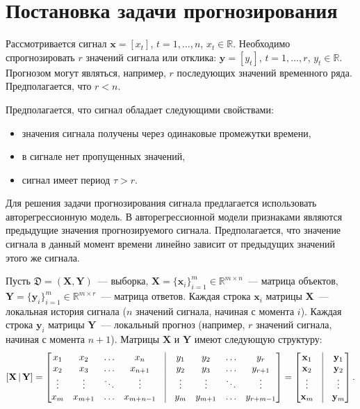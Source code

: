 \documentclass[12pt,twoside]{article}
\newcommand{\bx}{\mathbf{x}}
\newcommand{\by}{\mathbf{y}}
\newcommand{\bY}{\mathbf{Y}}
\newcommand{\bX}{\mathbf{X}}
\begin{document}

\section{Постановка задачи прогнозирования}
Рассмотривается сигнал $\mathbf{x} = [x_t]$,  $t = 1, \dots , n$, $x_t \in \mathbb{R}$. Необходимо спрогнозировать $r$ значений сигнала или отклика:  
$\mathbf{y} = [y_t]$,  $t = 1, \dots , r$, $y_t \in \mathbb{R}$. 
Прогнозом могут являться, например, $r$ последующих значений временного ряда. 
Предполагается, что $r < n$. 


Предполагается, что сигнал обладает следующими свойствами: 
\begin{itemize}
\item значения сигнала получены через одинаковые промежутки времени, 
\item в сигнале нет пропущенных значений,
\item сигнал имеет период $\tau > r$. 
\end{itemize}
Для решения задачи прогнозирования сигнала предлагается использовать авторегрессионную модель. 
В авторегрессионной модели признаками являются предыдущие значения прогнозируемого сигнала. 
Предполагается, что значение сигнала в данный момент времени линейно зависит от предыдущих значений этого же сигнала.

Пусть $\mathfrak{D}= \left( \bX, \bY \right)$~--- выборка, $\mathbf{X} = \{\bx_i\}_{i=1}^m \in \mathbb{R}^{m \times n}$~--- матрица объектов, $\mathbf{Y}= \{\by_i\}_{i=1}^m \in \mathbb{R}^{m \times r}$~--- матрица ответов. 
Каждая строка $\bx_i$ матрицы $\mathbf{X}$~--– локальная история сигнала ($n$ значений сигнала, начиная с момента $i$). 
Каждая строка $\by_i$ матрицы $\mathbf{Y}$~--– локальный прогноз (например, $r$ значений сигнала, начиная с момента $n+1$). Матрицы $\bX$ и $\bY$ имеют следующую структуру:
$$
\left[ \mathbf{X \, | \, Y} \right] = 
    \begin{bmatrix}
        x_1 & x_2 & \dots  & x_{n} & \vrule & y_1 & y_2 & \dots  & y_{r}\\
        x_2 & x_3 & \dots & x_{n + 1} & \vrule & y_2 & y_3 & \dots  & y_{r+1}\\
        \vdots & \vdots & \ddots & \vdots & \vrule & \vdots & \vdots & \ddots & \vdots \\
        x_{m} & x_{m+1} & \dots  & x_{m+n-1} & \vrule & y_{m} & y_{m+1} & \dots  & y_{r+m-1}
    \end{bmatrix} = 
    \begin{bmatrix}
        \bx_1 & \vrule & \by_1\\
        \bx_2 &\vrule & \by_2\\
        \vdots & \vrule &  \vdots \\
        \bx_m & \vrule & \by_m
    \end{bmatrix}.
$$
\end{document}
